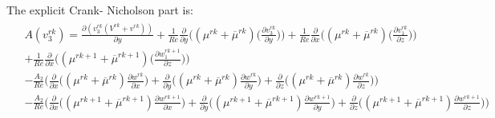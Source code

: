 \documentclass[preprint,12pt]{article}
\begin{document}
The explicit Crank- Nicholson part is:
\begin{align}\begin{split}
&A(v_3^{rk})=\frac{\partial (v_3^{rk}(V^{rk}+v^{rk}))}{\partial y}+\frac{1}{Re}\frac{\partial}{\partial y}\Big(({\mu}^{rk}+\overline{\mu}^{rk})\Big(\frac{\partial v_3^{rk}}{\partial y}\Big)\Big)+\frac{1}{Re}\frac{\partial}{\partial x}\Big(({\mu}^{rk}+\overline{\mu}^{rk})\Big(\frac{\partial v_1^{rk}}{\partial z}\Big)\Big)\\&+\frac{1}{Re}\frac{\partial}{\partial x}\Big(({\mu}^{rk+1}+\overline{\mu}^{rk+1})\Big(\frac{\partial w_1^{rk+1}}{\partial z}\Big)\Big)\\&-\frac{A_2}{Re}\Bigg(\frac{\partial}{\partial x}\Big((\mu^{rk}+\overline{\mu}^{rk})\frac{\partial w^{rk}}{\partial x}\Big)+\frac{\partial}{\partial y}\Big((\mu^{rk}+\overline{\mu}^{rk})\frac{\partial w^{rk}}{\partial y}\Big)+\frac{\partial}{\partial z}\Big((\mu^{rk}+\overline{\mu}^{rk})\frac{\partial w^{rk}}{\partial z}\Big)\Bigg)\\&-\frac{A_2}{Re}\Bigg(\frac{\partial}{\partial x}\Big((\mu^{rk+1}+\overline{\mu}^{rk+1})\frac{\partial w^{rk+1}}{\partial x}\Big)+\frac{\partial}{\partial y}\Big((\mu^{rk+1}+\overline{\mu}^{rk+1})\frac{\partial w^{rk+1}}{\partial y}\Big)+\frac{\partial}{\partial z}\Big((\mu^{rk+1}+\overline{\mu}^{rk+1})\frac{\partial w^{rk+1}}{\partial z}\Big)\Bigg)
\end{split} \end{align}	
\end{document}
